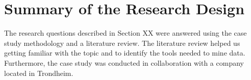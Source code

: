 




\section{Summary of the Research Design}
The research questions described in Section XX were answered using the case study methodology and a literature review. The literature review helped us getting familiar with the topic and to identify the tools needed to mine data. Furthermore, the case study was conducted in collaboration with a company located in Trondheim. 


























